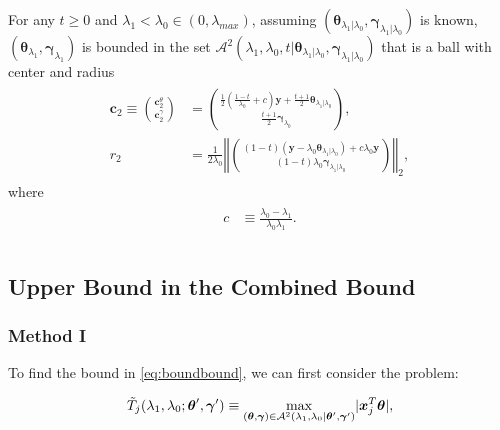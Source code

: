 \begin{theorem}
    \label{thm:1.2.alt}
    For any $t\geq0$ and $\lambda_1<\lambda_{0}\in (0,\lambda_{max})$, assuming $(\boldsymbol\theta_{\lambda_1|\lambda_0},\boldsymbol\gamma_{\lambda_1|\lambda_0})$ is known, $(\boldsymbol\theta_{\lambda_1},\boldsymbol\gamma_{\lambda_1})$ is bounded in the set $\mathcal{A}^2(\lambda_1,\lambda_0,t|\boldsymbol\theta_{\lambda_1|\lambda_0},\boldsymbol\gamma_{\lambda_1|\lambda_0})$ that is a ball with center and radius
    \begin{gather}
        \begin{aligned}
            \boldsymbol c_2\equiv\binom{\boldsymbol c_2^\theta}{\boldsymbol c_2^\gamma}&=\binom{\frac{1}{2}(\frac{1-t}{\lambda_0}+c)\boldsymbol y+\frac{t+1}{2}\boldsymbol\theta_{\lambda_1|\lambda_0}}{\frac{t+1}{2}\boldsymbol\gamma_{\lambda_0}},\\
            r_2&=\frac{1}{2\lambda_0}\left\Vert\binom{(1-t)(\boldsymbol y-\lambda_0\boldsymbol\theta_{\lambda_1|\lambda_0})+c\lambda_0\boldsymbol y}{(1-t)\lambda_0\boldsymbol\gamma_{\lambda_1|\lambda_0}}\right\Vert_2,
        \end{aligned}
    \end{gather}
    where
    \begin{gather}
        \begin{aligned}
            c&\equiv\frac{\lambda_0-\lambda_1}{\lambda_0\lambda_1}.\\
        \end{aligned}
    \end{gather}
\end{theorem}

\subsection{Upper Bound in the Combined Bound}

\subsubsection{Method I}

To find the bound in \eqref{eq:boundbound}, we can first consider the problem:

\begin{equation}
    \Tilde{T}_j(\lambda_1,\lambda_0;\boldsymbol\theta',\boldsymbol\gamma')\equiv\underset{(\boldsymbol\theta,\boldsymbol\gamma)\in\mathcal{A}^2(\lambda_1,\lambda_0|\boldsymbol\theta',\boldsymbol\gamma')}{\mathrm{max}}|\boldsymbol x_j^T\boldsymbol\theta|,
\end{equation}

